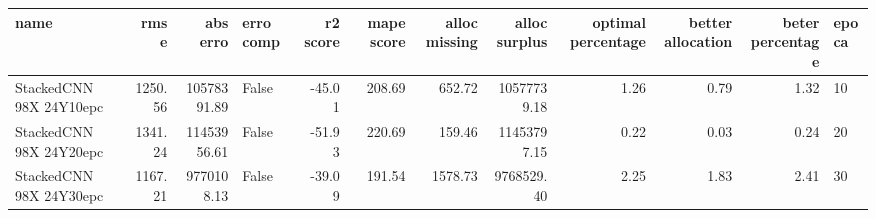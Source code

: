 \begin{tabular}{lrrlrrrrrrrl}
\toprule
name & rmse & abs erro & erro comp & r2 score & mape score & alloc missing & alloc surplus & optimal percentage & better allocation & beter percentage & epoca \\
\midrule
StackedCNN 98X 24Y10epc & 1250.56 & 10578391.89 & False & -45.01 & 208.69 & 652.72 & 10577739.18 & 1.26 & 0.79 & 1.32 & 10 \\
StackedCNN 98X 24Y20epc & 1341.24 & 11453956.61 & False & -51.93 & 220.69 & 159.46 & 11453797.15 & 0.22 & 0.03 & 0.24 & 20 \\
StackedCNN 98X 24Y30epc & 1167.21 & 9770108.13 & False & -39.09 & 191.54 & 1578.73 & 9768529.40 & 2.25 & 1.83 & 2.41 & 30 \\
\bottomrule
\end{tabular}
